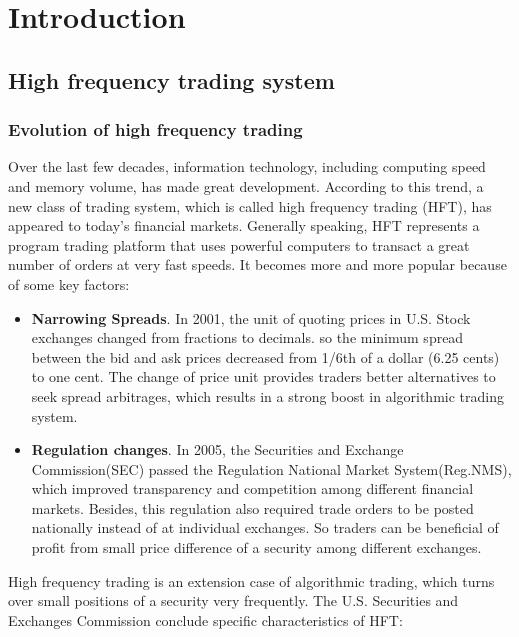 \chapter{Introduction}
\section{High frequency trading system}
\subsection{Evolution of high frequency trading}
Over the last few decades, information technology, including computing speed and memory volume, has made great development. According to this trend, a new class of trading system, which is called high frequency trading (HFT), has appeared to today's financial markets. Generally speaking,  HFT represents a program trading platform that uses powerful computers to transact a great number of orders at very fast speeds. It becomes more and more popular because of some key factors:\\
\begin{itemize}
\item \textbf{Narrowing Spreads}. In 2001, the unit of quoting prices in U.S. Stock exchanges changed from fractions to decimals. so the minimum spread between the bid and ask prices decreased from 1/6th of a dollar (6.25 cents) to one cent. The change of  price unit provides traders better alternatives to seek spread arbitrages, which results in a strong boost in algorithmic trading system.  \\
\item \textbf{Regulation changes}. In 2005, the Securities and Exchange Commission(SEC) passed the Regulation National Market System(Reg.NMS), which improved transparency and competition among different financial markets. Besides, this regulation also required trade orders to be posted nationally instead of at individual exchanges. So traders can be beneficial of profit from small price difference of a security among different exchanges. \\
\end{itemize}

High frequency trading is an extension case of algorithmic trading, which turns over small positions of a security very frequently. The U.S. Securities and Exchanges Commission conclude specific characteristics of HFT:\\

